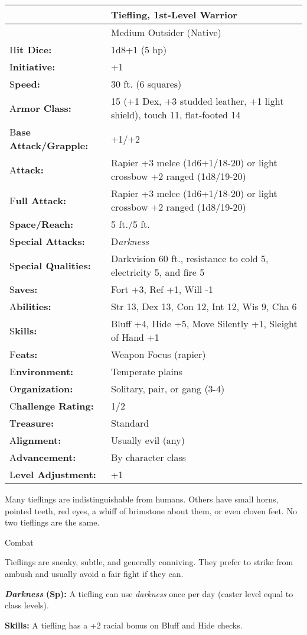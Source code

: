 \documentclass{article}
\begin{document}
\begin{tabular}{|>{\raggedright}p{78pt}|>{\raggedright}p{248pt}|}
\hline
  & Tiefling, 1st-Level Warrior\tabularnewline
\hline
  & Medium Outsider (Native)\tabularnewline
\hline
H\textbf{it Dice:} & 1d8+1 (5 hp)\tabularnewline
\hline
I\textbf{nitiative:} & +1\tabularnewline
\hline
S\textbf{peed:} & 30 ft. (6 squares)\tabularnewline
\hline
A\textbf{rmor Class:} & 15 (+1 Dex, +3 studded leather, +1 light shield), touch 
11, flat-footed 14\tabularnewline
\hline
B\textbf{ase Attack/Grapple:} & +1/+2\tabularnewline
\hline
A\textbf{ttack:} & Rapier +3 melee (1d6+1/18-20) or light crossbow +2 ranged (1d8/19-20)\tabularnewline
\hline
F\textbf{ull Attack:} & Rapier +3 melee (1d6+1/18-20) or light crossbow +2 ranged 
(1d8/19-20)\tabularnewline
\hline
S\textbf{pace/Reach:} & 5 ft./5 ft.\tabularnewline
\hline
S\textbf{pecial Attacks:} & D\textit{arkness}\tabularnewline
\hline
S\textbf{pecial Qualities:} & Darkvision 60 ft., resistance to cold 5, electricity 
5, and fire 5\tabularnewline
\hline
S\textbf{aves:} & Fort +3, Ref +1, Will -1\tabularnewline
\hline
A\textbf{bilities:} & Str 13, Dex 13, Con 12, Int 12, Wis 9, Cha 6\tabularnewline
\hline
S\textbf{kills:} & Bluff +4, Hide +5, Move Silently +1, Sleight of Hand +1\tabularnewline
\hline
F\textbf{eats:} & Weapon Focus (rapier)\tabularnewline
\hline
E\textbf{nvironment:} & Temperate plains\tabularnewline
\hline
O\textbf{rganization:} & Solitary, pair, or gang (3-4)\tabularnewline
\hline
C\textbf{hallenge Rating:} & 1/2\tabularnewline
\hline
T\textbf{reasure:} & Standard\tabularnewline
\hline
A\textbf{lignment:} & Usually evil (any)\tabularnewline
\hline
A\textbf{dvancement:} & By character class\tabularnewline
\hline
L\textbf{evel Adjustment:} & +1\tabularnewline
\hline
\end{tabular}

Many tieflings are indistinguishable from humans. Others have small horns, pointed 
teeth, red eyes, a whiff of brimstone about them, or even cloven feet. No two tieflings 
are the same. 

Combat

Tieflings are sneaky, subtle, and generally conniving. They prefer to strike from 
ambush and usually avoid a fair fight if they can.

\textit{\textbf{Darkness }}\textbf{(Sp): }A tiefling can use \textit{darkness }once 
per day (caster level equal to class levels).

\textbf{Skills:} A tiefling has a +2 racial bonus on Bluff and Hide checks.
\end{document}
